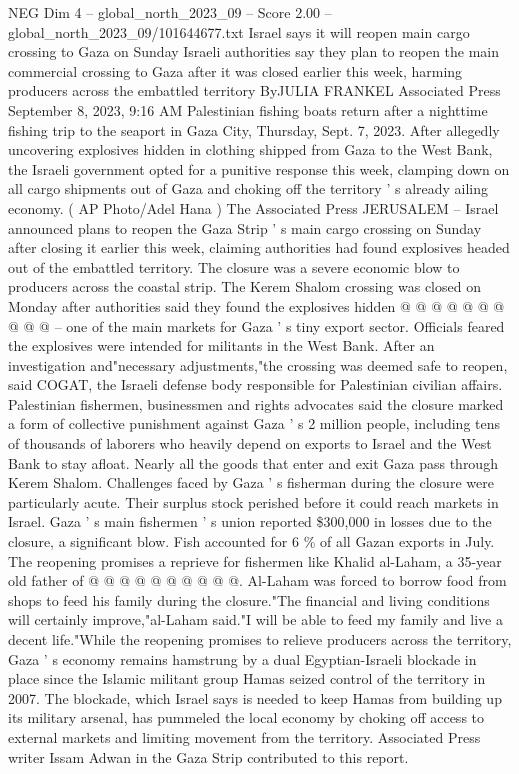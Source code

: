 \begin{textsample}{NEG Dim 4 – global\_north\_2023\_09 – Score 2.00 – global\_north\_2023\_09/101644677.txt}  \label{ex:f4_neg_047}
Israel says it will reopen main cargo crossing to Gaza on Sunday Israeli authorities say they plan to reopen the main commercial crossing to Gaza after it was closed earlier this week, harming producers across the embattled territory ByJULIA FRANKEL Associated Press September 8, 2023, 9:16 AM Palestinian fishing boats return after a nighttime fishing trip to the seaport in Gaza City, Thursday, Sept. 7, 2023.
After allegedly uncovering explosives hidden in clothing shipped from Gaza to the West Bank, the Israeli government opted for a punitive response this week, clamping down on all cargo shipments out of Gaza and choking off the territory ' s already ailing economy. ( AP Photo/Adel Hana ) The Associated Press JERUSALEM -- Israel announced plans to reopen the Gaza Strip ' s main cargo crossing on Sunday after closing it earlier this week, claiming authorities had found explosives headed out of the embattled territory.
The closure was a severe economic blow to producers across the coastal strip.
The Kerem Shalom crossing was closed on Monday after authorities said they found the explosives hidden @ @ @ @ @ @ @ @ @ @ -- one of the main markets for Gaza ' s tiny export sector.
Officials feared the explosives were intended for militants in the West Bank.
After an investigation and"necessary adjustments,"the crossing was deemed safe to reopen, said COGAT, the Israeli defense body responsible for Palestinian civilian affairs.
Palestinian fishermen, businessmen and rights advocates said the closure marked a form of collective punishment against Gaza ' s 2 million people, including tens of thousands of laborers who heavily depend on exports to Israel and the West Bank to stay afloat.
Nearly all the goods that enter and exit Gaza pass through Kerem Shalom.
Challenges faced by Gaza ' s fisherman during the closure were particularly acute.
Their surplus stock perished before it could reach markets in Israel.
Gaza ' s main fishermen ' s union reported \$300,000 in losses due to the closure, a significant blow.
Fish accounted for 6 \% of all Gazan exports in July.
The reopening promises a reprieve for fishermen like Khalid al-Laham, a 35-year old father of @ @ @ @ @ @ @ @ @ @.
Al-Laham was forced to borrow food from shops to feed his family during the closure."The financial and living conditions will certainly improve,"al-Laham said."I will be able to feed my family and live a decent life."While the reopening promises to relieve producers across the territory, Gaza ' s economy remains hamstrung by a dual Egyptian-Israeli blockade in place since the Islamic militant group Hamas seized control of the territory in 2007.
The blockade, which Israel says is needed to keep Hamas from building up its military arsenal, has pummeled the local economy by choking off access to external markets and limiting movement from the territory.
Associated Press writer Issam Adwan in the Gaza Strip contributed to this report.

\end{textsample}
